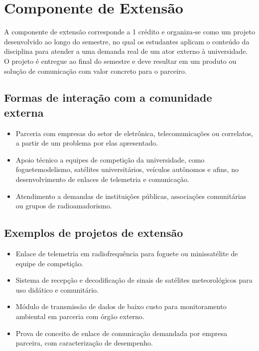 \documentclass[11pt,a4paper]{article}
\begin{document}
\section{Componente de Extensão}

A componente de extensão corresponde a 1 crédito e organiza-se como um projeto desenvolvido ao longo do semestre, no qual os estudantes aplicam o conteúdo da disciplina para atender a uma demanda real de um ator externo à universidade. O projeto é entregue ao final do semestre e deve resultar em um produto ou solução de comunicação com valor concreto para o parceiro.

\subsection*{Formas de interação com a comunidade externa}

\begin{itemize}[noitemsep]
  \item Parceria com empresas do setor de eletrônica, telecomunicações ou correlatos, a partir de um problema por elas apresentado.
  \item Apoio técnico a equipes de competição da universidade, como foguetemodelismo, satélites universitários, veículos autônomos e afins, no desenvolvimento de enlaces de telemetria e comunicação.
  \item Atendimento a demandas de instituições públicas, associações comunitárias ou grupos de radioamadorismo.
\end{itemize}

\subsection*{Exemplos de projetos de extensão}

\begin{itemize}[noitemsep]
  \item Enlace de telemetria em radiofrequência para foguete ou minissatélite de equipe de competição.
  \item Sistema de recepção e decodificação de sinais de satélites meteorológicos para uso didático e comunitário.
  \item Módulo de transmissão de dados de baixo custo para monitoramento ambiental em parceria com órgão externo.
  \item Prova de conceito de enlace de comunicação demandada por empresa parceira, com caracterização de desempenho.
\end{itemize}
\end{document}
